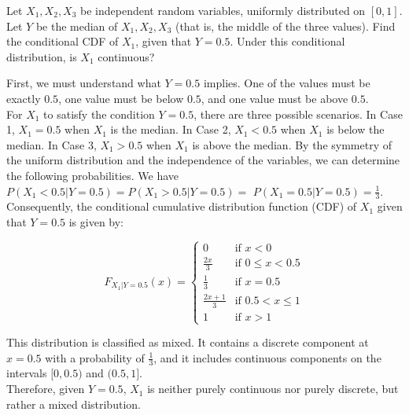 \begin{exercise}
Let \( X_1, X_2, X_3 \) be independent random variables, uniformly distributed on \([0, 1]\). Let \( Y \) be the median of \( X_1, X_2, X_3 \) (that is, the middle of the three values). Find the conditional CDF of \( X_1 \), given that \( Y = 0.5 \). Under this conditional distribution, is \( X_1 \) continuous?
\end{exercise}

\begin{solution}
First, we must understand what \( Y = 0.5 \) implies. One of the values must be exactly \( 0.5 \), one value must be below \( 0.5 \), and one value must be above \( 0.5 \).\\

For \( X_1 \) to satisfy the condition \( Y = 0.5 \), there are three possible scenarios. In Case 1, \( X_1 = 0.5 \) when \( X_1 \) is the median. In Case 2, \( X_1 < 0.5 \) when \( X_1 \) is below the median. In Case 3, \( X_1 > 0.5 \) when \( X_1 \) is above the median. By the symmetry of the uniform distribution and the independence of the variables, we can determine the following probabilities. We have \( P(X_1 < 0.5 | Y = 0.5) = P(X_1 > 0.5 | Y = 0.5) =\) \( P(X_1 = 0.5 | Y = 0.5) = \frac{1}{3} \).\\

Consequently, the conditional cumulative distribution function (CDF) of \( X_1 \) given that \( Y = 0.5 \) is given by:

\[
F_{X_1 | Y = 0.5}(x) = 
\begin{cases}
0 & \text{if } x < 0 \\
\frac{2x}{3} & \text{if } 0 \leq x < 0.5 \\
\frac{1}{3} & \text{if } x = 0.5 \\
\frac{2x + 1}{3} & \text{if } 0.5 < x \leq 1 \\
1 & \text{if } x > 1
\end{cases}
\]

This distribution is classified as mixed. It contains a discrete component at \( x = 0.5 \) with a probability of \( \frac{1}{3} \), and it includes continuous components on the intervals \( [0, 0.5) \) and \( (0.5, 1] \).\\

Therefore, given \( Y = 0.5 \), \( X_1 \) is neither purely continuous nor purely discrete, but rather a mixed distribution.
\end{solution}
